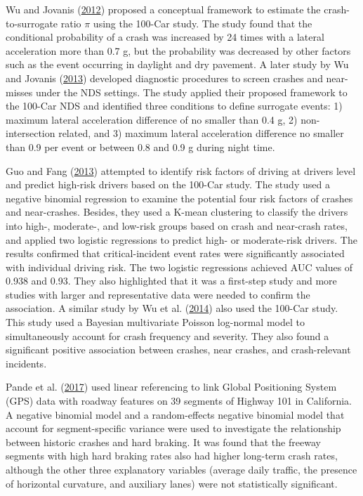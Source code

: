 \documentclass[12pt]{book}
\numberwithin{equation}{chapter}
\begin{document}
Wu and Jovanis (\protect\hyperlink{ref-wu2012crashes}{2012}) proposed a conceptual framework to estimate the crash-to-surrogate ratio \(\pi\) using the 100-Car study. The study found that the conditional probability of a crash was increased by 24 times with a lateral acceleration more than 0.7 g, but the probability was decreased by other factors such as the event occurring in daylight and dry pavement. A later study by Wu and Jovanis (\protect\hyperlink{ref-wu2013defining}{2013}) developed diagnostic procedures to screen crashes and near-misses under the NDS settings. The study applied their proposed framework to the 100-Car NDS and identified three conditions to define surrogate events: 1) maximum lateral acceleration difference of no smaller than 0.4 g, 2) non-intersection related, and 3) maximum lateral acceleration difference no smaller than 0.9 per event or between 0.8 and 0.9 g during night time.

Guo and Fang (\protect\hyperlink{ref-guo2013individual}{2013}) attempted to identify risk factors of driving at drivers level and predict high-risk drivers based on the 100-Car study. The study used a negative binomial regression to examine the potential four risk factors of crashes and near-crashes. Besides, they used a K-mean clustering to classify the drivers into high-, moderate-, and low-risk groups based on crash and near-crash rates, and applied two logistic regressions to predict high- or moderate-risk drivers. The results confirmed that critical-incident event rates were significantly associated with individual driving risk. The two logistic regressions achieved AUC values of 0.938 and 0.93. They also highlighted that it was a first-step study and more studies with larger and representative data were needed to confirm the association. A similar study by Wu et al. (\protect\hyperlink{ref-wu2014using}{2014}) also used the 100-Car study. This study used a Bayesian multivariate Poisson log-normal model to simultaneously account for crash frequency and severity. They also found a significant positive association between crashes, near crashes, and crash-relevant incidents.

Pande et al. (\protect\hyperlink{ref-pande2017preliminary}{2017}) used linear referencing to link Global Positioning System (GPS) data with roadway features on 39 segments of Highway 101 in California. A negative binomial model and a random-effects negative binomial model that account for segment-specific variance were used to investigate the relationship between historic crashes and hard braking. It was found that the freeway segments with high hard braking rates also had higher long-term crash rates, although the other three explanatory variables (average daily traffic, the presence of horizontal curvature, and auxiliary lanes) were not statistically significant.
\end{document}
